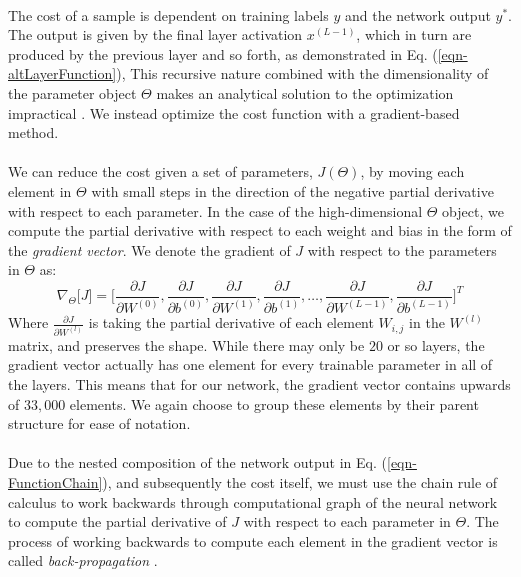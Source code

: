\documentclass[12pt,letterpaper]{article}
\begin{document}
\paragraph*{}The cost of a sample is dependent on training labels $y$ and the network output $y^*$. The output is given by the final layer activation $x^{(L-1)}$, which in turn are produced by the previous layer and so forth, as demonstrated in Eq. (\ref{eqn-altLayerFunction}), This recursive nature combined with the dimensionality of the parameter object $\Theta$ makes an analytical solution to the optimization impractical \cite{Geron,Goodfellow,James}. We instead optimize the cost function with a gradient-based method. 

\paragraph*{}We can reduce the cost given a set of parameters, $J(\Theta)$, by moving each element in $\Theta$ with small steps in the direction of the negative partial derivative with respect to each parameter. In the case of the high-dimensional $\Theta$ object, we compute the partial derivative with respect to each weight and bias in the form of the \textit{gradient vector}. We denote the gradient of $J$ with respect to the parameters in $\Theta$ as:
\begin{equation}
\label{eqn-CostGradient}
\nabla_{\Theta}\big[ J \big] = 
\Big[ 	\frac{\partial J}{\partial W^{(0)}}, \frac{\partial J}{\partial b^{(0)}}, 
		\frac{\partial J}{\partial W^{(1)}}, \frac{\partial J}{\partial b^{(1)}}, \hdots ,
		\frac{\partial J}{\partial W^{(L-1)}}, \frac{\partial J}{\partial b^{(L-1)}} \Big]^T
\end{equation}
Where $\frac{\partial J}{\partial W^{(l)}}$ is taking the partial derivative of each element $W_{i,j}$ in the $W^{(l)}$ matrix, and preserves the shape. While there may only be $20$ or so layers, the gradient vector actually has one element for every trainable parameter in all of the layers. This means that for our network, the gradient vector contains upwards of $33,000$ elements. We again choose to group these elements by their parent structure for ease of notation.

\paragraph*{}Due to the nested composition of the network output in Eq. (\ref{eqn-FunctionChain}), and subsequently the cost itself, we must use the chain rule of calculus to work backwards through computational graph of the neural network to compute the partial derivative of $J$ with respect to each parameter in $\Theta$. The process of working backwards to compute each element in the gradient vector is called \textit{back-propagation} \cite{Geron,Goodfellow,Loy}. 
\end{document}
